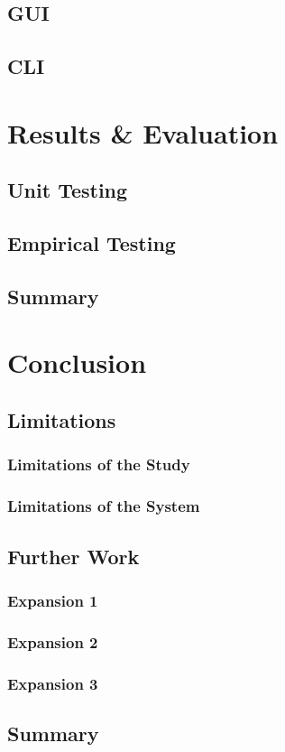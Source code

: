 \documentclass[a4paper, 11pt, twocolumn, twoside]{report}
\begin{document}
\section{GUI}

\section{CLI}

\chapter{Results \& Evaluation}

\section{Unit Testing}

\section{Empirical Testing}

\section{Summary}

\chapter{Conclusion}

\section{Limitations}

\subsection{Limitations of the Study}

\subsection{Limitations of the System}

\section{Further Work}

\subsection{Expansion 1}

\subsection{Expansion 2}

\subsection{Expansion 3}

\section{Summary}


\end{document}

